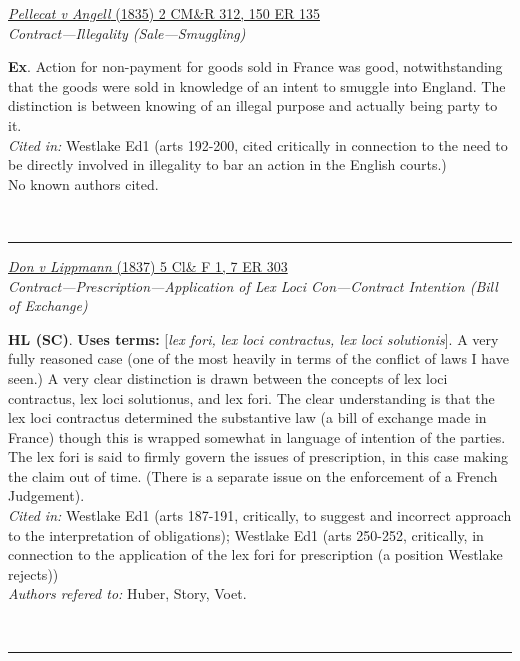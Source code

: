 \documentclass[twoside]{article}
\begin{document}
        \begin{small}
        \begin{center}
        \href{https://heinonline.org/HOL/P?h=hein.engrep/engrh0150&i=139}{\textit{Pellecat v Angell} (1835) 2 CM\&R 312, 150 ER 135} \label{89} \\ 
\textit{Contract---Illegality (Sale---Smuggling)}\\
        \end{center}
        \textbf{Ex}. Action for non-payment for goods sold in France was good, notwithstanding that the goods were sold in knowledge of an intent to smuggle into England. The distinction is between knowing of an illegal purpose and actually being party to it.\\\textit{Cited in: }Westlake Ed1 (arts 192-200, cited critically in connection to the need to be directly involved in illegality to bar an action in the English courts.)\\No known authors cited.
        \end{small}\\
        \rule{\textwidth}{0.5pt}
        

        \begin{small}
        \begin{center}
        \href{https://heinonline.org/HOL/P?h=hein.engrep/engra0007&i=313}{\textit{Don v Lippmann} (1837) 5 Cl\& F 1, 7 ER 303} \label{86} \\ 
\textit{Contract---Prescription---Application of Lex Loci Con---Contract Intention (Bill of Exchange)}\\
        \end{center}
        \textbf{HL (SC)}.  \textbf{Uses terms: }[\textit{lex fori, lex loci contractus, lex loci solutionis}]. A very fully reasoned case (one of the most heavily in terms of the conflict of laws I have seen.) A very clear distinction is drawn between the concepts of lex loci contractus, lex loci solutionus, and lex fori. The clear understanding is that the lex loci contractus determined the substantive law (a bill of exchange made in France) though this is wrapped somewhat in language of intention of the parties. The lex fori is said to firmly govern the issues of prescription, in this case making the claim out of time. (There is a separate issue on the enforcement of a French Judgement).\\\textit{Cited in: }Westlake Ed1 (arts 187-191, critically, to suggest and incorrect approach to the interpretation of obligations); Westlake Ed1 (arts 250-252, critically, in connection to the application of the lex fori for prescription (a position Westlake rejects))\\\textit{Authors refered to: }Huber, Story, Voet.
        \end{small}\\
        \rule{\textwidth}{0.5pt}
        
\end{document}
